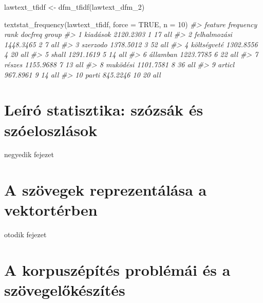 \documentclass[
]{book}
\newenvironment{Shaded}{\begin{snugshade}}{\end{snugshade}}
\newcommand{\AttributeTok}[1]{\textcolor[rgb]{0.77,0.63,0.00}{#1}}
\newcommand{\CommentTok}[1]{\textcolor[rgb]{0.56,0.35,0.01}{\textit{#1}}}
\newcommand{\ConstantTok}[1]{\textcolor[rgb]{0.00,0.00,0.00}{#1}}
\newcommand{\DecValTok}[1]{\textcolor[rgb]{0.00,0.00,0.81}{#1}}
\newcommand{\FunctionTok}[1]{\textcolor[rgb]{0.00,0.00,0.00}{#1}}
\newcommand{\NormalTok}[1]{#1}
\newcommand{\OtherTok}[1]{\textcolor[rgb]{0.56,0.35,0.01}{#1}}
\begin{document}
\begin{Shaded}
\begin{Highlighting}[]
\NormalTok{lawtext\_tfidf }\OtherTok{\textless{}{-}} \FunctionTok{dfm\_tfidf}\NormalTok{(lawtext\_dfm\_2)}

\FunctionTok{textstat\_frequency}\NormalTok{(lawtext\_tfidf, }\AttributeTok{force =} \ConstantTok{TRUE}\NormalTok{, }\AttributeTok{n =} \DecValTok{10}\NormalTok{)}
\CommentTok{\#\textgreater{}         feature frequency rank docfreq group}
\CommentTok{\#\textgreater{} 1      kiadások 2120.2303    1      17   all}
\CommentTok{\#\textgreater{} 2  felhalmozási 1448.3465    2       7   all}
\CommentTok{\#\textgreater{} 3      szerzodo 1378.5012    3      52   all}
\CommentTok{\#\textgreater{} 4   költségveté 1302.8556    4      20   all}
\CommentTok{\#\textgreater{} 5         shall 1291.1619    5      14   all}
\CommentTok{\#\textgreater{} 6      államban 1223.7785    6      22   all}
\CommentTok{\#\textgreater{} 7        részes 1155.9688    7      13   all}
\CommentTok{\#\textgreater{} 8      muködési 1101.7581    8      36   all}
\CommentTok{\#\textgreater{} 9        articl  967.8961    9      14   all}
\CommentTok{\#\textgreater{} 10        parti  845.2246   10      20   all}
\end{Highlighting}
\end{Shaded}

\hypertarget{leuxedruxf3-statisztika-szuxf3zsuxe1k-uxe9s-szuxf3eloszluxe1sok}{%
\chapter{Leíró statisztika: szózsák és
szóeloszlások}\label{leuxedruxf3-statisztika-szuxf3zsuxe1k-uxe9s-szuxf3eloszluxe1sok}}

negyedik fejezet

\hypertarget{a-szuxf6vegek-reprezentuxe1luxe1sa-a-vektortuxe9rben}{%
\chapter{A szövegek reprezentálása a
vektortérben}\label{a-szuxf6vegek-reprezentuxe1luxe1sa-a-vektortuxe9rben}}

otodik fejezet

\hypertarget{a-korpuszuxe9puxedtuxe9s-probluxe9muxe1i-uxe9s-a-szuxf6vegelux151kuxe9szuxedtuxe9s}{%
\chapter{A korpuszépítés problémái és a
szövegelőkészítés}\label{a-korpuszuxe9puxedtuxe9s-probluxe9muxe1i-uxe9s-a-szuxf6vegelux151kuxe9szuxedtuxe9s}}
\end{document}
